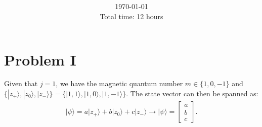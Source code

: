 \documentclass[letterpaper,11pt,twoside]{article}
\title{\textbf{\assignment}\\\course\\{\Large\institution}}
\author{\autor}
\date{\today\\Total time: 12 hours}
\newcommand{\ket}[1]{|#1\rangle}
\begin{document}
\pagestyle{mainstyle}
\maketitle
\section*{Problem I}
Given that $j=1$, we have the magnetic quantum number $m\in\{1,0,-1\}$ and $\{\ket{z_+},\ket{z_0},\ket{z_-}\}=\{\ket{1,1},\ket{1,0},\ket{1,-1}\}$.
The state vector can then be spanned as:
\begin{align*}
  \ket{\psi}=a\ket{z_+}+b\ket{z_0}+c\ket{z_-}\longrightarrow\ket{\psi}=\begin{bmatrix}
    a\\b\\c
  \end{bmatrix}.
\end{align*}
\end{document}
